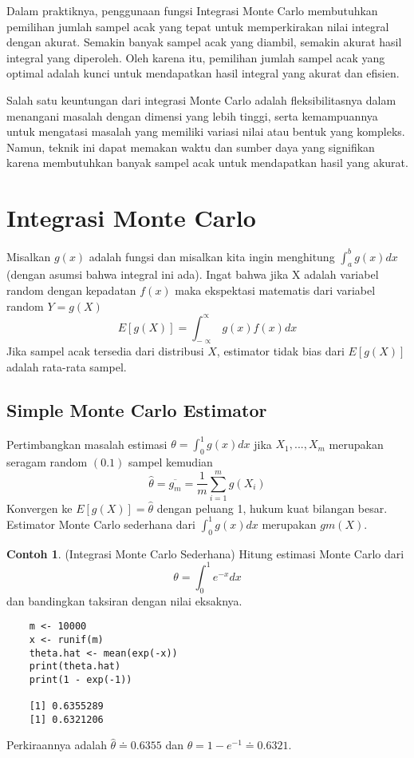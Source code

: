 \documentclass[a4paper,12pt]{article}
\theoremstyle{definition}
\newtheorem{example}{Contoh}[section]
\begin{document}
Dalam praktiknya, penggunaan fungsi Integrasi Monte Carlo membutuhkan pemilihan jumlah sampel acak yang tepat untuk memperkirakan nilai integral dengan akurat. Semakin banyak sampel acak yang diambil, semakin akurat hasil integral yang diperoleh. Oleh karena itu, pemilihan jumlah sampel acak yang optimal adalah kunci untuk mendapatkan hasil integral yang akurat dan efisien.

Salah satu keuntungan dari integrasi Monte Carlo adalah fleksibilitasnya dalam menangani masalah dengan dimensi yang lebih tinggi, serta kemampuannya untuk mengatasi masalah yang memiliki variasi nilai atau bentuk yang kompleks. Namun, teknik ini dapat memakan waktu dan sumber daya yang signifikan karena membutuhkan banyak sampel acak untuk mendapatkan hasil yang akurat.

\section{Integrasi Monte Carlo}
Misalkan $g(x)$ adalah fungsi dan misalkan kita ingin menghitung $\int_{a}^{b}g(x)dx$ (dengan asumsi bahwa integral ini ada). Ingat bahwa jika X adalah variabel random dengan kepadatan $f(x)$ maka ekspektasi matematis dari variabel random $Y = g(X)$ 
\begin{equation}
    E[g(X)]=\int_{-\propto }^{\propto } g(x)f(x)dx
\end{equation}
Jika sampel acak tersedia dari distribusi $X$, estimator tidak bias dari $E[g(X)]$ adalah rata-rata sampel.
\subsection{Simple Monte Carlo Estimator}
Pertimbangkan masalah estimasi $\theta = \int_{0}^{1}g(x)dx$ jika $X_1,...,X_m$ merupakan seragam random $(0.1)$ sampel kemudian
\begin{equation}
    \hat{\theta}=\overline{g_{m}}=\frac{1}{m}\sum_{i=1}^{m}g(X_{i})
\end{equation}
Konvergen ke $E\left [ g(X) \right ]=  \hat{\theta}$ dengan peluang 1, hukum kuat bilangan besar. Estimator Monte Carlo sederhana dari $\int_{0}^{1}g(x)dx$ merupakan $gm(X)$.

\begin{example}
    
(Integrasi Monte Carlo Sederhana)
Hitung estimasi Monte Carlo dari
\begin{equation}
    \theta =\int_{0}^{1}e^{-x}dx
\end{equation}
dan bandingkan taksiran dengan nilai eksaknya.
\end{example}
\begin{lstlisting}
    m <- 10000
    x <- runif(m)
    theta.hat <- mean(exp(-x))
    print(theta.hat)
    print(1 - exp(-1))

    [1] 0.6355289
    [1] 0.6321206
\end{lstlisting}
Perkiraannya adalah $\hat{\theta}\doteq  0.6355$ dan $\theta = 1-e^{-1}\doteq  0.6321.$
\end{document}
